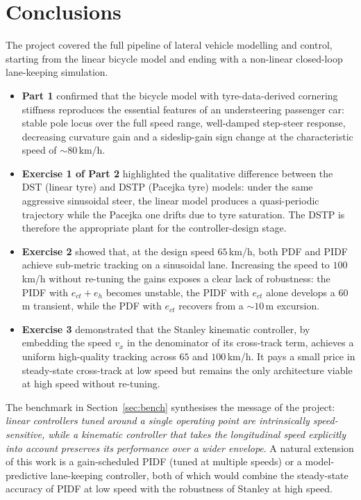 \section{Conclusions}
The project covered the full pipeline of lateral vehicle modelling
and control, starting from the linear bicycle model and ending with
a non-linear closed-loop lane-keeping simulation.
\begin{itemize}
    \item \textbf{Part 1} confirmed that the bicycle model with
          tyre-data-derived cornering stiffness reproduces the
          essential features of an understeering passenger car:
          stable pole locus over the full speed range, well-damped
          step-steer response, decreasing curvature gain and a
          sideslip-gain sign change at the characteristic speed of
          $\sim 80$\,km/h.
    \item \textbf{Exercise 1 of Part 2} highlighted the qualitative
          difference between the DST (linear tyre) and DSTP (Pacejka
          tyre) models: under the same aggressive sinusoidal steer,
          the linear model produces a quasi-periodic trajectory while
          the Pacejka one drifts due to tyre saturation. The DSTP is
          therefore the appropriate plant for the controller-design
          stage.
    \item \textbf{Exercise 2} showed that, at the design speed
          $65$\,km/h, both PDF and PIDF achieve sub-metric tracking on
          a sinusoidal lane. Increasing the speed to $100$\,km/h
          without re-tuning the gains exposes a clear lack of
          robustness: the PIDF with $e_{ct}+e_h$ becomes unstable,
          the PIDF with $e_{ct}$ alone develops a $60$\,m transient,
          while the PDF with $e_{ct}$ recovers from a $\sim\!10$\,m
          excursion.
    \item \textbf{Exercise 3} demonstrated that the Stanley
          kinematic controller, by embedding the speed $v_x$ in the
          denominator of its cross-track term, achieves a uniform
          high-quality tracking across $65$ and $100$\,km/h. It pays
          a small price in steady-state cross-track at low speed but
          remains the only architecture viable at high speed without
          re-tuning.
\end{itemize}

The benchmark in Section~\ref{sec:bench} synthesises the message of
the project: \emph{linear controllers tuned around a single operating
point are intrinsically speed-sensitive, while a kinematic controller
that takes the longitudinal speed explicitly into account preserves
its performance over a wider envelope}. A natural extension of this
work is a gain-scheduled PIDF (tuned at multiple speeds) or a
model-predictive lane-keeping controller, both of which would
combine the steady-state accuracy of PIDF at low speed with the
robustness of Stanley at high speed.

